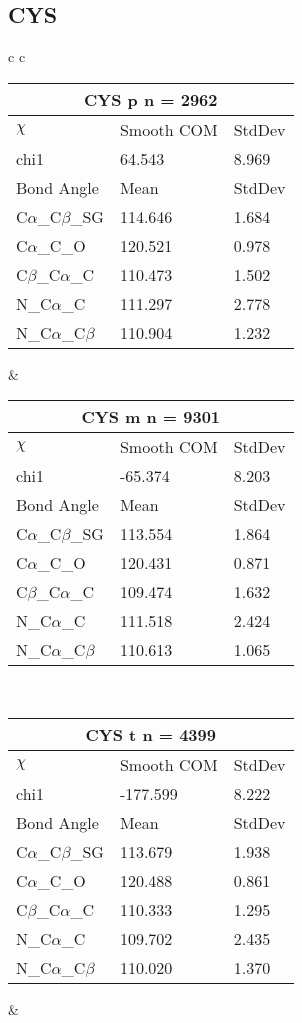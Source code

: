 \newpage
\subsection{CYS}

\begin{longtable}{ c c }

  \begin{tabular}{ l l l }
  \toprule
  \multicolumn{3}{c}{CYS \textbf{p} n = 2962} \\ \toprule
  $\chi$       & Smooth COM & StdDev \\ \midrule
  chi1 & 64.543 & 8.969 \\ \midrule
  Bond Angle   & Mean     & StdDev \\ \midrule
  C$\alpha$\_C$\beta$\_SG & 114.646 & 1.684\\
  C$\alpha$\_C\_O & 120.521 & 0.978\\
  C$\beta$\_C$\alpha$\_C & 110.473 & 1.502\\
  N\_C$\alpha$\_C & 111.297 & 2.778\\
  N\_C$\alpha$\_C$\beta$ & 110.904 & 1.232\\
  \bottomrule
  \end{tabular}
  &
  \begin{tabular}{ l l l }
  \toprule
  \multicolumn{3}{c}{CYS \textbf{m} n = 9301} \\ \toprule
  $\chi$       & Smooth COM & StdDev \\ \midrule
  chi1 & -65.374 & 8.203 \\ \midrule
  Bond Angle   & Mean     & StdDev \\ \midrule
  C$\alpha$\_C$\beta$\_SG & 113.554 & 1.864\\
  C$\alpha$\_C\_O & 120.431 & 0.871\\
  C$\beta$\_C$\alpha$\_C & 109.474 & 1.632\\
  N\_C$\alpha$\_C & 111.518 & 2.424\\
  N\_C$\alpha$\_C$\beta$ & 110.613 & 1.065\\
  \bottomrule
  \end{tabular}
  \\
  \begin{tabular}{ l l l }
  \toprule
  \multicolumn{3}{c}{CYS \textbf{t} n = 4399} \\ \toprule
  $\chi$       & Smooth COM & StdDev \\ \midrule
  chi1 & -177.599 & 8.222 \\ \midrule
  Bond Angle   & Mean     & StdDev \\ \midrule
  C$\alpha$\_C$\beta$\_SG & 113.679 & 1.938\\
  C$\alpha$\_C\_O & 120.488 & 0.861\\
  C$\beta$\_C$\alpha$\_C & 110.333 & 1.295\\
  N\_C$\alpha$\_C & 109.702 & 2.435\\
  N\_C$\alpha$\_C$\beta$ & 110.020 & 1.370\\
  \bottomrule
  \end{tabular}
  &
  \\
  
\end{longtable}    

